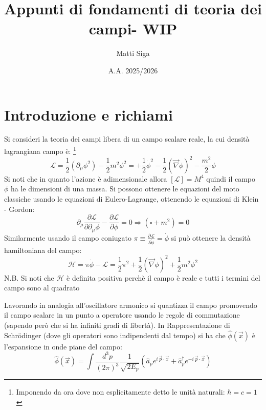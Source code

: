 \documentclass[]{article}
\author{Matti Siga}
\title{Appunti di fondamenti di teoria dei campi- WIP}
\date{A.A. 2025/2026}
\newcommand{\Lag}{\mathcal{L}}
\newcommand{\Ham}{\mathcal{H}}
\begin{document}
\maketitle
\tableofcontents
\onehalfspacing

\section{Introduzione e richiami}
Si consideri la teoria dei campi libera di un campo scalare reale, la cui densità lagrangiana campo è: \footnote{Imponendo da ora dove non esplicitamente detto le unità naturali: $\hbar = c = 1$}
\begin{equation}
 \Lag = \frac{1}{2} \left(  \partial_\mu \phi^ 2 \right)  -\frac{1}{2} m^2 \phi^2 = +\frac{1}{2} \dot{\phi}^2 -\frac{1}{2} \left( \vec\nabla \phi \right)^2 - \frac{m^2}{2} \phi
\end{equation}
Si noti che in quanto l'azione è adimensionale allora $\left[\Lag \right] = M^4$ quindi il campo $\phi$ ha le dimensioni di una massa. Si possono ottenere le equazioni del moto classiche usando le equazioni di Eulero-Lagrange, ottenendo le equazioni di Klein - Gordon:
\begin{equation}
 \partial_\mu \frac{\partial \Lag}{\partial \partial_\mu \phi} - \frac{\partial \Lag}{\partial \phi} = 0 \Rightarrow \left( \square + m^2 \right) = 0
\end{equation}
Similarmente usando il campo coniugato $\pi \equiv \frac{\partial \Lag}{\partial \dot{\phi}} = \dot{\phi}$ si può ottenere la densità hamiltoniana del campo:
\begin{equation}
 \Ham = \pi \dot{\phi} - \Lag = \frac{1}{2} \pi^2 + \frac{1}{2} \left( \vec \nabla \phi \right)^2 + \frac{1}{2} m^2 \phi^2
\end{equation}
N.B. Si noti che $\Ham$ è definita positiva perchè il campo è reale e tutti i termini del campo sono al quadrato

Lavorando in analogia all'oscillatore armonico si quantizza il campo promovendo il campo scalare in un punto a operatore usando le regole di commutazione (sapendo però che si ha infiniti gradi di libertà). In Rappresentazione di Schrödinger (dove gli operatori sono indipendenti dal tempo) si ha che $\hat{\phi}(\vec{x})$ è l'espansione in onde piane del campo:
\begin{equation}
  \hat{\phi}(\vec{x}) = \int \frac{d^3 p}{(2 \pi)^3} \frac{1}{\sqrt{2E_p}} \left( \hat{a}_p e^{ i\, \vec p \cdot \vec x} + \hat{a}^\dagger_p e ^ {-i \, \vec p \cdot \vec x} \right)
\end{equation}
\end{document}
